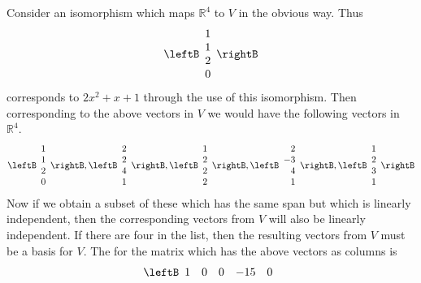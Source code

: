 \begin{solution}
Consider an isomorphism which maps $\mathbb{R}%
^{4}$ to $V$ in the obvious way. Thus 
\begin{equation*}
\leftB 
\begin{array}{c}
1 \\ 
1 \\ 
2 \\ 
0
\end{array}
\rightB
\end{equation*}
corresponds to $2x^{2}+x+1$ through the use of this isomorphism. Then
corresponding to the above vectors in $V$ we would have the following
vectors in $\mathbb{R}^{4}.$ 
\begin{equation*}
\leftB 
\begin{array}{c}
1 \\ 
1 \\ 
2 \\ 
0
\end{array}
\rightB ,\leftB 
\begin{array}{c}
2 \\ 
2 \\ 
4 \\ 
1
\end{array}
\rightB ,\leftB 
\begin{array}{c}
1 \\ 
2 \\ 
2 \\ 
2
\end{array}
\rightB ,\leftB 
\begin{array}{r}
2 \\ 
-3 \\ 
4 \\ 
1
\end{array}
\rightB ,\leftB 
\begin{array}{c}
1 \\ 
2 \\ 
3 \\ 
1
\end{array}
\rightB
\end{equation*}
Now if we obtain a subset of these which has the same span but which is
linearly independent, then the corresponding vectors from $V$ will also be
linearly independent. If there are four
in the list, then the resulting vectors from $V$ must be a basis for $V$.
The \rref\; for the matrix which has the above vectors as
columns is 
\begin{equation*}
\leftB 
\begin{array}{rrrrr}
1 & 0 & 0 & -15 & 0 \\ 

\end{array}
\end{equation*}
\end{solution}

